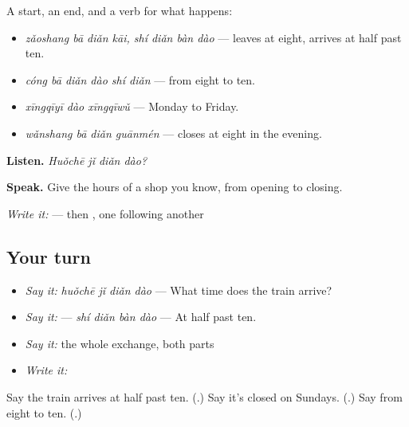 \begin{grammarlens}[title={What you've built — reading the times off a notice}]
A start, an end, and a verb for what happens:

\begin{itemize}
\raggedright
  \item \textbf{ } \emph{zǎoshang bā diǎn kāi, shí diǎn bàn dào} — leaves at eight, arrives at half past ten.
  \item \textbf{} \emph{cóng bā diǎn dào shí diǎn} — from eight to ten.
  \item \textbf{} \emph{xīngqīyī dào xīngqīwǔ} — Monday to Friday.
  \item \emph{wǎnshang bā diǎn guānmén} — closes at eight in the evening.
\end{itemize}

\textbf{Listen.} \emph{Huǒchē jǐ diǎn dào?}

\textbf{Speak.} Give the hours of a shop you know, from opening to closing.

\emph{Write it:}  — then , one  following another
\end{grammarlens}

\subsection*{Your turn}
\begin{itemize}
\raggedright
  \item \emph{Say it:} \emph{huǒchē jǐ diǎn dào} — What time does the train arrive?
  \item \emph{Say it:}  — \emph{shí diǎn bàn dào} — At half past ten.
  \item \emph{Say it:} the whole exchange, both parts
  \item \emph{Write it:} 
\end{itemize}

\begin{tcolorbox}[breakable,colback=teal!4,colframe=teal!35!black,title={Before you move on}]
Say the train arrives at half past ten. (\textbf{}.) Say it's closed on Sundays. (\textbf{}.) Say from eight to ten. (\textbf{}.)
\end{tcolorbox}
